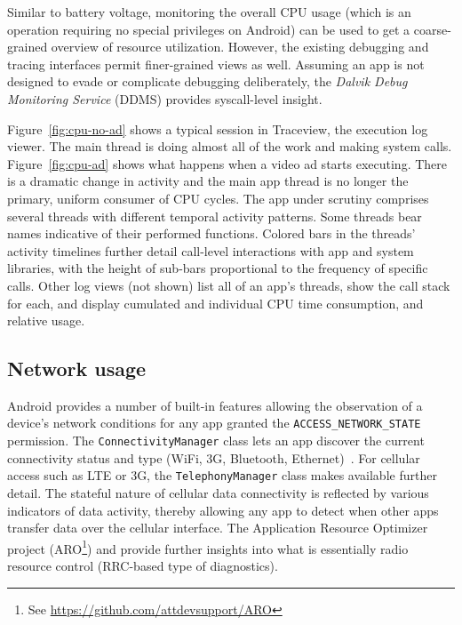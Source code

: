 Similar to battery voltage, monitoring the overall CPU usage 
(which is an operation requiring no special privileges on Android) 
can be used to get a coarse-grained overview of resource utilization. 
However, the existing debugging and tracing interfaces permit 
finer-grained views as well. Assuming an app is not designed to 
evade or complicate debugging deliberately, the 
\textit{Dalvik Debug Monitoring Service} (DDMS) 
provides syscall-level insight.  

Figure~\ref{fig:cpu-no-ad} shows a typical  
session in Traceview, the execution log viewer.  The main thread is doing almost all of the work
and making system calls.  Figure~\ref{fig:cpu-ad} shows what happens when a video ad starts 
executing.  There is a dramatic change in activity and the main app thread is no longer 
the primary, uniform consumer of CPU cycles.
The app under scrutiny comprises several threads with different 
temporal activity patterns. Some threads bear names indicative 
of their performed functions. Colored bars in the threads' activity 
timelines further detail call-level interactions with app and system 
libraries, with the height of sub-bars proportional to the frequency 
of specific calls.  
Other log views (not shown) list all of an app's threads, show the 
call stack for each, and display cumulated and individual CPU time 
consumption, and relative usage.



\subsection{Network usage}

Android provides a number of built-in features allowing the observation 
of a device's network conditions for any app granted the 
\texttt{ACCESS\_NETWORK\_STATE} permission. 
The \texttt{ConnectivityManager} class lets an app discover the 
current connectivity status and type (WiFi, 3G, Bluetooth, Ethernet)~\cite{che2011case}. 
For cellular access such as LTE or 3G, the \texttt{TelephonyManager} 
class makes available further detail. The stateful nature of cellular 
data connectivity is reflected by various indicators of data activity, 
thereby allowing any app to detect when other apps transfer data over 
the cellular interface.  The Application Resource Optimizer project
(ARO\footnote{See \url{https://github.com/attdevsupport/ARO}}) and \cite{Ricciato2010551} 
provide further insights into what is 
essentially radio resource control (RRC-based type of diagnostics).

